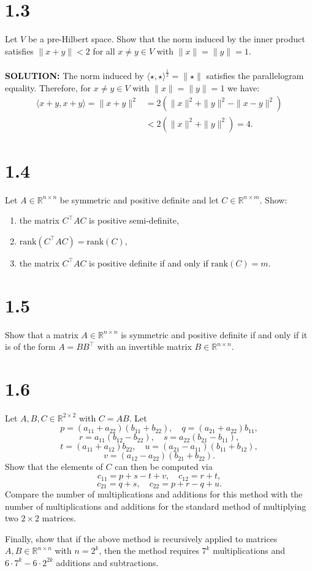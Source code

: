 \documentclass{article}
\begin{document}
\section*{1.3}
Let $V$ be a pre-Hilbert space. Show that the norm induced by the inner product satisfies $\|x + y\| < 2$ for all $x \neq y \in V$ with $\|x\| = \|y\| = 1$.
\\
\\
\noindent \textbf{SOLUTION: }
The norm induced by $\langle \star, \star \rangle^{\frac{1}{2}} =  \| \star \|$ satisfies the parallelogram equality. Therefore, 
for $x \neq y \in V$ with $\|x\| = \|y\| = 1$ we have:
\begin{align*}
    \langle x + y , x + y  \rangle = \|x + y\|^2 &= 2(\|x\|^2 + \|y\|^2 - \|x-y\|^2)\\ 
    &< 2(\|x\|^2 + \|y\|^2) = 4.
\end{align*}
\section*{1.4}
Let $A \in \mathbb{R}^{n \times n}$ be symmetric and positive definite and let $C \in \mathbb{R}^{n \times m}$. Show:
\begin{enumerate}
    \item the matrix $C^\top AC$ is positive semi-definite,
    \item $\text{rank}(C^\top AC) = \text{rank}(C)$,
    \item the matrix $C^\top AC$ is positive definite if and only if $\text{rank}(C) = m$.
\end{enumerate}

\section*{1.5}
Show that a matrix $A \in \mathbb{R}^{n \times n}$ is symmetric and positive definite if and only if it is of the form $A = B B^\top$ with an invertible matrix $B \in \mathbb{R}^{n \times n}$.

\section*{1.6}
Let $A, B, C \in \mathbb{R}^{2 \times 2}$ with $C = AB$. Let
\[
p = (a_{11} + a_{22})(b_{11} + b_{22}), \quad q = (a_{21} + a_{22})b_{11},
\]
\[
r = a_{11}(b_{12} - b_{22}), \quad s = a_{22}(b_{21} - b_{11}),
\]
\[
t = (a_{11} + a_{12})b_{22}, \quad u = (a_{21} - a_{11})(b_{11} + b_{12}),
\]
\[
v = (a_{12} - a_{22})(b_{21} + b_{22}).
\]
Show that the elements of $C$ can then be computed via
\[
c_{11} = p + s - t + v, \quad c_{12} = r + t,
\]
\[
c_{21} = q + s, \quad c_{22} = p + r - q + u.
\]
Compare the number of multiplications and additions for this method with the number of multiplications and additions for the standard method of multiplying two $2 \times 2$ matrices.

Finally, show that if the above method is recursively applied to matrices $A, B \in \mathbb{R}^{n \times n}$ with $n = 2^k$, then the method requires $7^k$ multiplications and $6 \cdot 7^k - 6 \cdot 2^{2k}$ additions and subtractions.
\end{document}
